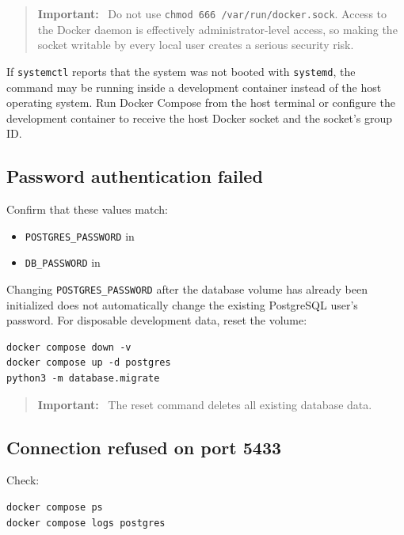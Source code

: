 \documentclass[11pt,a4paper]{article}
\newcommand{\filename}[1]{\texttt{\detokenize{#1}}}
\newenvironment{important}
  {\begin{quote}\color{codered}\textbf{Important:}\ }
  {\end{quote}}
\begin{document}
\begin{important}
Do not use \texttt{chmod 666 /var/run/docker.sock}. Access to the Docker daemon
is effectively administrator-level access, so making the socket writable by
every local user creates a serious security risk.
\end{important}

If \texttt{systemctl} reports that the system was not booted with
\texttt{systemd}, the command may be running inside a development container
instead of the host operating system. Run Docker Compose from the host terminal
or configure the development container to receive the host Docker socket and
the socket's group ID.

\subsection{Password authentication failed}

Confirm that these values match:

\begin{itemize}[leftmargin=2em]
    \item \texttt{POSTGRES\_PASSWORD} in \filename{docker-compose.yml}
    \item \texttt{DB\_PASSWORD} in \filename{.env}
\end{itemize}

Changing \texttt{POSTGRES\_PASSWORD} after the database volume has already been
initialized does not automatically change the existing PostgreSQL user's
password. For disposable development data, reset the volume:

\begin{lstlisting}[style=terminal]
docker compose down -v
docker compose up -d postgres
python3 -m database.migrate
\end{lstlisting}

\begin{important}
The reset command deletes all existing database data.
\end{important}

\subsection{Connection refused on port 5433}

Check:

\begin{lstlisting}[style=terminal]
docker compose ps
docker compose logs postgres
\end{lstlisting}
\end{document}

